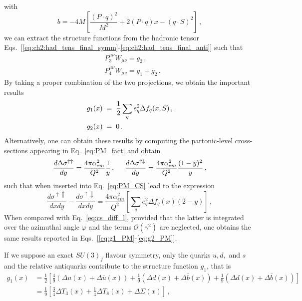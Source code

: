 with 
\begin{equation}
  b = -4M \left[ \frac{(P\cdot q)^2}{M^2}  + 2 (P \cdot q) x - (q \cdot S)^2\right]\,,
\end{equation}
we can extract the structure functions from the hadronic tensor Eqs.~[\ref{eq:ch2:had_tens_final_symm}-\ref{eq:ch2:had_tens_final_anti}] such that
\begin{align}
  &P_3^{\mu \nu} W_{\mu \nu} = g_2\,, \\
  &P_4^{\mu \nu} W_{\mu \nu} = g_1 + g_2 \,.
\end{align}
By taking a proper combination of the two projections, we obtain the important results
\begin{align}
  &g_1(x) \hspace{1mm} = \hspace{1mm} \frac{1}{2} \sum_{q} e_q^2 \Delta f_{q} (x, S) \,,
  \label{eq:g1_PM}\\
  &g_2 (x) \hspace{1mm} = \hspace{1mm} 0\,.
  \label{eq:g2_PM}
\end{align}
Alternatively, one can obtain these results by computing the partonic-level cross-sections appearing in Eq.~\eqref{eq:PM_fact} and obtain
\begin{equation}
  \frac{d \Delta \sigma^{\uparrow \uparrow}}{dy} = \frac{4 \pi \alpha_{em}^2}{Q^2} \frac{1}{y} \,, \hspace{5mm} \frac{d \Delta \sigma^{\uparrow \downarrow}}{dy} = \frac{4 \pi \alpha_{em}^2}{Q^2} \frac{(1-y)^2}{y}\,,
\end{equation}
such that when inserted into Eq.~\eqref{eq:PM_CS} lead to the expression
\begin{equation}
  \frac{d \sigma^{\uparrow \Uparrow}}{dx dy} - \frac{d \sigma^{\uparrow \Downarrow}}{dx dy} = \frac{4 \pi \alpha_{em}^2}{Q^2} \left[ \sum_{q} e_q^2 \Delta f_{q}(x) (2-y)\right] \,,
\end{equation}
When compared with Eq.~\eqref{eq:cs_diff_l}, provided that the latter is integrated over the azimuthal angle $\varphi$ and the terms $\mathcal{O}(\gamma^2)$ are neglected, one obtains the same results reported in Eqs.~[\ref{eq:g1_PM}-\ref{eq:g2_PM}].\par
If we suppose an exact $SU(3)_f$ flavour symmetry, only the quarks $u,d,$ and $s$ and the relative antiquarks contribute to the structure function $g_1$, that is
\begin{equation}
  \begin{split}
    g_1(x) & = \frac{1}{2} \left[ \frac{4}{9} \left( \Delta u(x) + \Delta \bar{u}(x) \right) + \frac{1}{9} \left(  \Delta d (x) + \Delta \bar{b}(x)  \right) + \frac{1}{9}\left(  \Delta d (x) + \Delta \bar{b}(x)  \right) \right] \\
    & = \frac{1}{9} \left[ \frac{3}{4} \Delta T_3 (x) + \frac{1}{4} \Delta T_8 (x) + \Delta \Sigma (x)  \right] \,,
  \end{split}
  \label{eq:g1_NPM_ev}
\end{equation}
